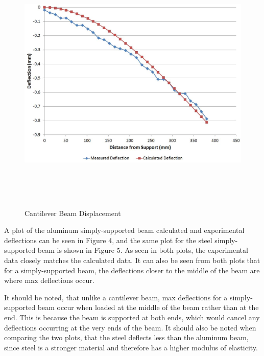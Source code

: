 \documentclass[12pt]{article}
\begin{document}
\newpage

\begin{figure}[h!]  
  \centering
    \includegraphics[width=\linewidth,height=5in]{cantilever_deflection.JPG}
    \caption{Cantilever Beam Displacement}
\end{figure}
\bigskip
\bigskip

A plot of the aluminum simply-supported beam calculated and experimental deflections can be seen in Figure 4, and the same plot for the steel simply-supported beam is shown in Figure 5. As seen in both plots, the experimental data closely matches the calculated data. It can also be seen from both plots that for a simply-supported beam, the deflections closer to the middle of the beam are where max deflections occur. 
\bigskip

It should be noted, that unlike a cantilever beam, max deflections for a simply-supported beam occur when loaded at the middle of the beam rather than at the end. This is because the beam is supported at both ends, which would cancel any deflections occurring at the very ends of the beam. It should also be noted when comparing the two plots, that the steel deflects less than the aluminum beam, since steel is a stronger material and therefore has a higher modulus of elasticity. 
\bigskip

\newpage
\end{document}
